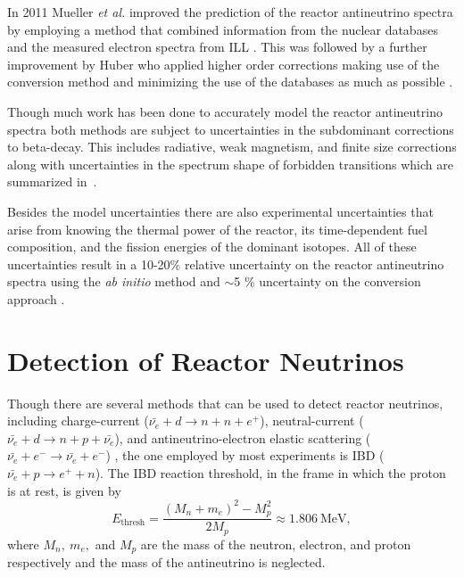 In 2011 Mueller \textit{et al.} improved the prediction of the reactor antineutrino spectra by employing a method that combined information from the nuclear databases and the measured electron spectra from ILL \cite{Mueller}. 
This was followed by a further improvement by Huber who applied higher order corrections making use of the conversion method and minimizing the use of the databases as much as possible \cite{Huber}.

Though much work has been done to accurately model the reactor antineutrino spectra both methods are subject to uncertainties in the subdominant corrections to beta-decay. This includes radiative, weak magnetism, and finite size corrections along with uncertainties in the spectrum shape of forbidden transitions which are summarized in~\cite{HayesVogel}. 

Besides the model uncertainties there are also experimental uncertainties that arise from knowing the thermal power of the reactor, its time-dependent fuel composition, and the fission energies of the dominant isotopes.
All of these uncertainties result in a 10-20\% relative uncertainty on the reactor antineutrino spectra using the \textit{ab initio} method and $\sim$5 \% uncertainty on the conversion approach \cite{Qian:2018wid}.



\section{Detection of Reactor Neutrinos}

Though there are several methods that can be used to detect reactor neutrinos, including charge-current ($\bar{\nu_e} + d \rightarrow n + n + e^+$), neutral-current ($\bar{\nu_e} + d \rightarrow n + p + \bar{\nu_e}$), and antineutrino-electron elastic scattering ($\bar{\nu_e} + e^- \rightarrow \bar{\nu_e} + e^-$) \cite{SuperKOsc,SNO}, the one employed by most experiments is IBD ($\bar{\nu_e} + p \rightarrow e^+ + n$).
The IBD reaction threshold, in the frame in which the proton is at rest, is given by
\begin{equation}
	E_{\textrm{thresh}} = \frac{(M_n + m_e)^2 - M_p^2}{2M_p} \approx 1.806~\textrm{MeV},
\end{equation}
where $M_n, ~m_e,$ and $M_p$ are the mass of the neutron, electron, and proton respectively and the mass of the antineutrino is neglected.

